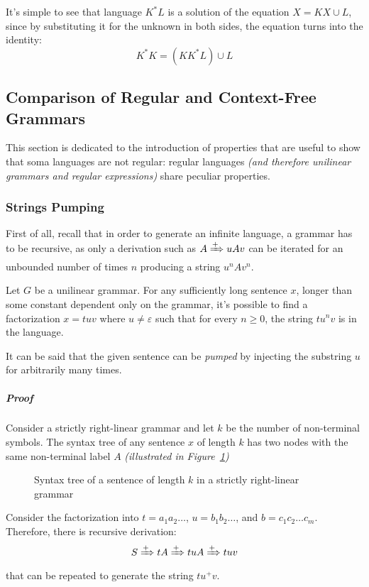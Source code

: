 \documentclass[english]{article}
\begin{document}
It's simple to see that language \(K^\ast L\) is a solution of the equation \(X = K X \cup L\), since by substituting it for the unknown in both sides, the equation turns into the identity:
\[ K^\ast K = (K K^\ast L) \cup L \]

\subsection{Comparison of Regular and Context-Free Grammars}

This section is dedicated to the introduction of properties that are useful to show that soma languages are not regular:
regular languages \textit{(and therefore unilinear grammars and regular expressions)} share peculiar properties.

\subsubsection{Strings Pumping}

First of all, recall that in order to generate an infinite language, a grammar has to be recursive, as only a derivation such as \(A \xRightarrow{+} u A v\) can be iterated for an unbounded number of times \(n\) producing a string \(u^n A v^n\).

Let \(G\) be a unilinear grammar.
For any sufficiently long sentence \(x\), longer than some constant dependent only on the grammar, it's possible to find a factorization \(x = tuv\) where \(u \neq \varepsilon\) such that for every \(n \geq 0\), the string \(t u^n v\) is in the language.

It can be said that the given sentence can be \textit{pumped} by injecting the substring \(u\) for arbitrarily many times.

\subparagraph*{Proof}

Consider a strictly right-linear grammar and let \(k\) be the number of non-terminal symbols.
The syntax tree of any sentence \(x\) of length \(k\) has two nodes with the same non-terminal label \(A\) \textit{(illustrated in Figure~\ref{fig:pumping-strings-syntax-tree})}

\begin{figure}[htbp]
  \centering
  \bigskip
  \caption{Syntax tree of a sentence of length \(k\) in a strictly right-linear grammar}
  \label{fig:pumping-strings-syntax-tree}
  \bigskip
\end{figure}

Consider the factorization into \(t = a_1 a_2 \ldots\), \(u = b_1 b_2 \ldots\), and \(b = c_1 c_2 \ldots c_m\).
Therefore, there is recursive derivation:
\[S \xRightarrow{+} t A \xRightarrow{+} tuA \xRightarrow{+} tuv \]
that can be repeated to generate the string \(tu^+ v\).
\end{document}
